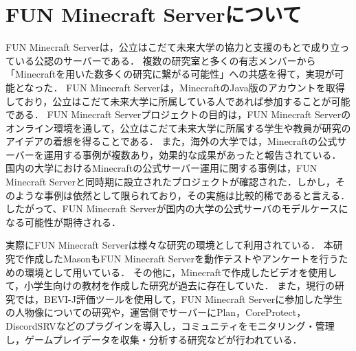 \section{FUN Minecraft Serverについて}
FUN Minecraft Server\cite{bib:fun_minecraft_server}は，公立はこだて未来大学の協力と支援のもとで成り立っている公認のサーバーである．
複数の研究室と多くの有志メンバーから「Minecraftを用いた数多くの研究に繋がる可能性」への共感を得て，実現が可能となった．
FUN Minecraft Serverは，MinecraftのJava版のアカウントを取得しており，公立はこだて未来大学に所属している人であれば参加することが可能である．
FUN Minecraft Serverプロジェクトの目的は，FUN Minecraft Serverのオンライン環境を通して，公立はこだて未来大学に所属する学生や教員が研究のアイデアの着想を得ることである．
また，海外の大学では，Minecraftの公式サーバーを運用する事例が複数あり，効果的な成果があったと報告されている\cite{bib:cambridge_minecraft_server}．
国内の大学におけるMinecraftの公式サーバー運用に関する事例は，FUN Minecraft Serverと同時期に設立されたプロジェクトが確認された．しかし，そのような事例は依然として限られており，その実施は比較的稀であると言える．
したがって、FUN Minecraft Serverが国内の大学の公式サーバのモデルケースになる可能性が期待される．

実際にFUN Minecraft Serverは様々な研究の環境として利用されている\cite{bib:fun_minecraft_server_research,bib:fun_minecraft_server_research2}．
本研究で作成したMasonもFUN Minecraft Serverを動作テストやアンケートを行うための環境として用いている．
その他に，Minecraftで作成したビデオを使用して，小学生向けの教材を作成した研究が過去に存在していた．
また，現行の研究では，BEVI-J評価ツールを使用して，FUN Minecraft Serverに参加した学生の人物像についての研究や，運営側でサーバーにPlan，CoreProtect，DiscordSRVなどのプラグインを導入し，コミュニティをモニタリング・管理し，ゲームプレイデータを収集・分析する研究などが行われている．